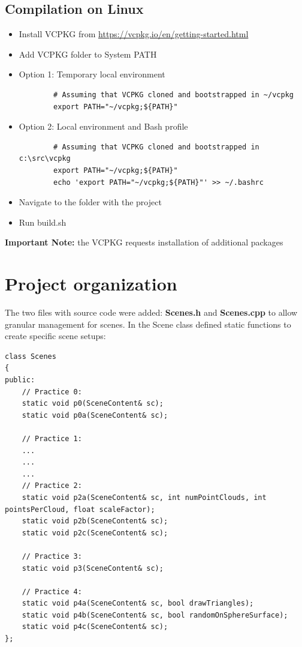 \documentclass[12pt,a4paper,english]{article}
\begin{document}
\subsection{Compilation on Linux}

\begin{itemize}
    \item Install VCPKG from \url{https://vcpkg.io/en/getting-started.html}
    \item Add VCPKG folder to System PATH
    \item Option 1: Temporary local environment
          \begin{verbatim}
        # Assuming that VCPKG cloned and bootstrapped in ~/vcpkg
        export PATH="~/vcpkg;${PATH}"
    \end{verbatim}

    \item Option 2: Local environment and Bash profile
          \begin{verbatim}
        # Assuming that VCPKG cloned and bootstrapped in c:\src\vcpkg
        export PATH="~/vcpkg;${PATH}"
        echo 'export PATH="~/vcpkg;${PATH}"' >> ~/.bashrc
    \end{verbatim}

    \item Navigate to the folder with the project
    \item Run build.sh
\end{itemize}
\textbf{Important Note:} the VCPKG requests installation of additional packages

\section{Project organization}

The two files with source code were added: \textbf{Scenes.h} and \textbf{Scenes.cpp} to allow granular management for scenes.
In the Scene class defined static functions to create specific scene setups:

\begin{verbatim}
class Scenes
{
public:
    // Practice 0:
    static void p0(SceneContent& sc);
    static void p0a(SceneContent& sc);

    // Practice 1:
    ...
    ...
    ...
    // Practice 2:
    static void p2a(SceneContent& sc, int numPointClouds, int pointsPerCloud, float scaleFactor);
    static void p2b(SceneContent& sc);
    static void p2c(SceneContent& sc);

    // Practice 3:
    static void p3(SceneContent& sc);

    // Practice 4:
    static void p4a(SceneContent& sc, bool drawTriangles);
    static void p4b(SceneContent& sc, bool randomOnSphereSurface);
    static void p4c(SceneContent& sc);
};
\end{verbatim}
\end{document}
